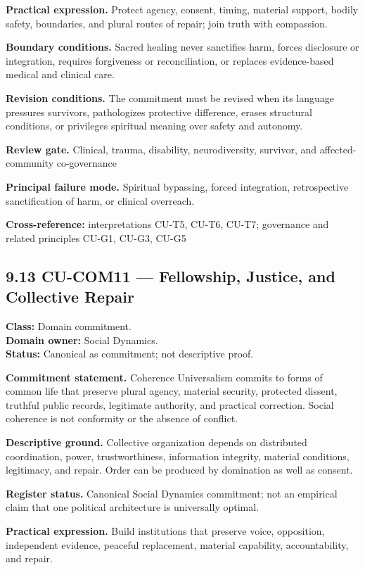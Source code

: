 \documentclass[
  11pt,
]{article}
\begin{document}
\textbf{Practical expression.} Protect agency, consent, timing, material
support, bodily safety, boundaries, and plural routes of repair; join
truth with compassion.

\textbf{Boundary conditions.} Sacred healing never sanctifies harm,
forces disclosure or integration, requires forgiveness or
reconciliation, or replaces evidence-based medical and clinical care.

\textbf{Revision conditions.} The commitment must be revised when its
language pressures survivors, pathologizes protective difference, erases
structural conditions, or privileges spiritual meaning over safety and
autonomy.

\textbf{Review gate.} Clinical, trauma, disability, neurodiversity,
survivor, and affected-community co-governance

\textbf{Principal failure mode.} Spiritual bypassing, forced
integration, retrospective sanctification of harm, or clinical
overreach.

\textbf{Cross-reference:} interpretations CU-T5, CU-T6, CU-T7;
governance and related principles CU-G1, CU-G3, CU-G5

\subsection{9.13 CU-COM11 --- Fellowship, Justice, and Collective
Repair}\label{cu-com11-fellowship-justice-and-collective-repair}

\textbf{Class:} Domain commitment.\\
\textbf{Domain owner:} Social Dynamics.\\
\textbf{Status:} Canonical as commitment; not descriptive proof.

\textbf{Commitment statement.} Coherence Universalism commits to forms
of common life that preserve plural agency, material security, protected
dissent, truthful public records, legitimate authority, and practical
correction. Social coherence is not conformity or the absence of
conflict.

\textbf{Descriptive ground.} Collective organization depends on
distributed coordination, power, trustworthiness, information integrity,
material conditions, legitimacy, and repair. Order can be produced by
domination as well as consent.

\textbf{Register status.} Canonical Social Dynamics commitment; not an
empirical claim that one political architecture is universally optimal.

\textbf{Practical expression.} Build institutions that preserve voice,
opposition, independent evidence, peaceful replacement, material
capability, accountability, and repair.
\end{document}
